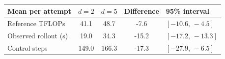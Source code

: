 \begin{tabular}{@{}lS[table-format=3.1]S[table-format=3.1]S[table-format=-2.1]l@{}}
\toprule
Mean per attempt & {$d=2$} & {$d=5$} & {Difference} & 95\% interval\\
\midrule
Reference TFLOPs & 41.1 & 48.7 & -7.6 & $[-10.6,\,-4.5]$\\
Observed rollout (s) & 19.0 & 34.3 & -15.2 & $[-17.2,\,-13.3]$\\
Control steps & 149.0 & 166.3 & -17.3 & $[-27.9,\,-6.5]$\\
\bottomrule
\end{tabular}
